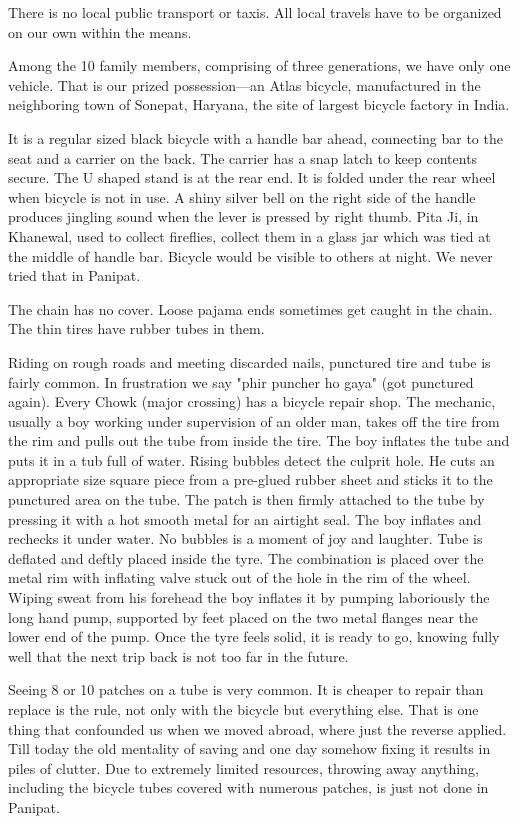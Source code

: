 There is no local public transport or taxis. All local travels have to be
organized on our own within the means.

Among the 10 family members, comprising of three generations, we have only
one vehicle. That is our prized possession—an Atlas bicycle, manufactured
in the neighboring town of Sonepat, Haryana, the site of largest bicycle
factory in India.

It is a regular sized black bicycle with a handle bar ahead, connecting
bar to the seat and a carrier on the back. The carrier has a snap latch to
keep contents secure. The U shaped stand is at the rear end. It is folded
under the rear wheel when bicycle is not in use. A shiny silver bell on
the right side of the handle produces jingling sound when the lever is
pressed by right thumb. Pita Ji, in Khanewal, used to collect fireflies,
collect them in a glass jar which was tied at the middle of handle bar.
Bicycle would be visible to others at night. We never tried that in
Panipat.

The chain has no cover. Loose pajama ends sometimes get caught in the
chain. The thin tires have rubber tubes in them.

Riding on rough roads and meeting discarded nails, punctured tire and tube
is fairly common. In frustration we say "phir puncher ho gaya" (got
punctured again). Every Chowk (major crossing) has a bicycle repair shop.
The mechanic, usually a boy working under supervision of an older man,
takes off the tire from the rim and pulls out the tube from inside the
tire. The boy inflates the tube and puts it in a tub full of water. Rising
bubbles detect the culprit hole. He cuts an appropriate size square piece
from a pre-glued rubber sheet and sticks it to the punctured area on the
tube. The patch is then firmly attached to the tube by pressing it with
a hot smooth metal for an airtight seal. The boy inflates and rechecks it
under water. No bubbles is a moment of joy and laughter. Tube is deflated
and deftly placed inside the tyre. The combination is placed over the
metal rim with inflating valve stuck out of the hole in the rim of the
wheel. Wiping sweat from his forehead the boy inflates it by pumping
laboriously the long hand pump, supported by feet placed on the two metal
flanges near the lower end of the pump. Once the tyre feels solid, it is
ready to go, knowing fully well that the next trip back is not too far in
the future.

Seeing 8 or 10 patches on a tube is very common. It is cheaper to repair
than replace is the rule, not only with the bicycle but everything else.
That is one thing that confounded us when we moved abroad, where just the
reverse applied. Till today the old mentality of saving and one day
somehow fixing it results in piles of clutter. Due to extremely limited
resources, throwing away anything, including the bicycle tubes covered
with numerous patches, is just not done in Panipat.


